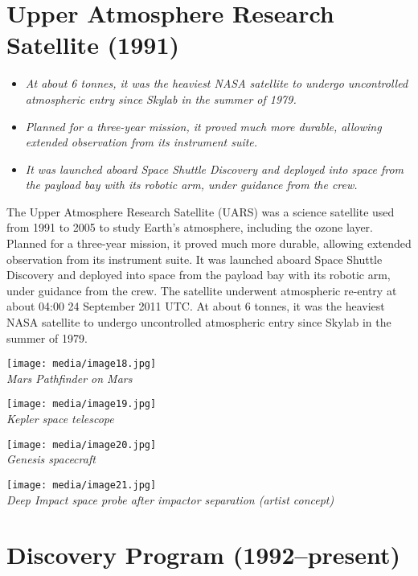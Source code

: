 \section{Upper Atmosphere Research Satellite
(1991)}\label{upper-atmosphere-research-satellite-1991}

\begin{itemize}
\item
  \emph{At about 6 tonnes, it was the heaviest NASA satellite to undergo
  uncontrolled atmospheric entry since Skylab in the summer of 1979.}
\item
  \emph{Planned for a three-year mission, it proved much more durable,
  allowing extended observation from its instrument suite.}
\item
  \emph{It was launched aboard Space Shuttle Discovery and deployed into
  space from the payload bay with its robotic arm, under guidance from
  the crew.}
\end{itemize}

The Upper Atmosphere Research Satellite (UARS) was a science satellite
used from 1991 to 2005 to study Earth's atmosphere, including the ozone
layer. Planned for a three-year mission, it proved much more durable,
allowing extended observation from its instrument suite. It was launched
aboard Space Shuttle Discovery and deployed into space from the payload
bay with its robotic arm, under guidance from the crew. The satellite
underwent atmospheric re-entry at about 04:00 24 September 2011 UTC. At
about 6 tonnes, it was the heaviest NASA satellite to undergo
uncontrolled atmospheric entry since Skylab in the summer of 1979.

\texttt{[image: media/image18.jpg]}\\
\emph{Mars Pathfinder on Mars}

\texttt{[image: media/image19.jpg]}\\
\emph{Kepler space telescope}

\texttt{[image: media/image20.jpg]}\\
\emph{Genesis spacecraft}

\texttt{[image: media/image21.jpg]}\\
\emph{Deep Impact space probe after impactor separation (artist
concept)}

\section{Discovery Program
(1992--present)}\label{discovery-program-1992present}

